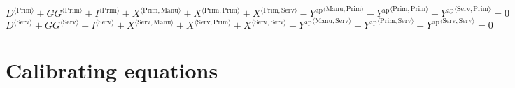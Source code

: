 \begin{equation}
{D}^{\langle \mathrm{Prim}\rangle} + {{G\!G}}^{\langle \mathrm{Prim}\rangle} + {I}^{\langle \mathrm{Prim}\rangle} + {X}^{\langle \mathrm{Prim},\mathrm{Manu}\rangle} + {X}^{\langle \mathrm{Prim},\mathrm{Prim}\rangle} + {X}^{\langle \mathrm{Prim},\mathrm{Serv}\rangle} - {Y^{\mathrm{ap}}}^{\langle \mathrm{Manu},\mathrm{Prim}\rangle} - {Y^{\mathrm{ap}}}^{\langle \mathrm{Prim},\mathrm{Prim}\rangle} - {Y^{\mathrm{ap}}}^{\langle \mathrm{Serv},\mathrm{Prim}\rangle} = 0
\end{equation}
\begin{equation}
{D}^{\langle \mathrm{Serv}\rangle} + {{G\!G}}^{\langle \mathrm{Serv}\rangle} + {I}^{\langle \mathrm{Serv}\rangle} + {X}^{\langle \mathrm{Serv},\mathrm{Manu}\rangle} + {X}^{\langle \mathrm{Serv},\mathrm{Prim}\rangle} + {X}^{\langle \mathrm{Serv},\mathrm{Serv}\rangle} - {Y^{\mathrm{ap}}}^{\langle \mathrm{Manu},\mathrm{Serv}\rangle} - {Y^{\mathrm{ap}}}^{\langle \mathrm{Prim},\mathrm{Serv}\rangle} - {Y^{\mathrm{ap}}}^{\langle \mathrm{Serv},\mathrm{Serv}\rangle} = 0
\end{equation}



\section{Calibrating equations}

